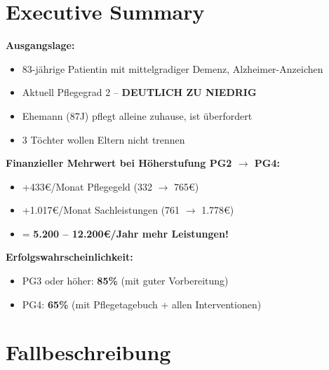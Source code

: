 \documentclass[11pt,a4paper]{article}
\begin{document}
\tableofcontents
\newpage

\section{Executive Summary}

\begin{successbox}

\textbf{Ausgangslage:}
\begin{itemize}[noitemsep]
    \item 83-jährige Patientin mit mittelgradiger Demenz, Alzheimer-Anzeichen
    \item Aktuell Pflegegrad 2 -- \textbf{DEUTLICH ZU NIEDRIG}
    \item Ehemann (87J) pflegt alleine zuhause, ist überfordert
    \item 3 Töchter wollen Eltern nicht trennen
\end{itemize}

\vspace{0.5cm}
\textbf{Finanzieller Mehrwert bei Höherstufung PG2 $\rightarrow$ PG4:}
\begin{itemize}[noitemsep]
    \item +433\euro{}/Monat Pflegegeld (332 $\rightarrow$ 765\euro{})
    \item +1.017\euro{}/Monat Sachleistungen (761 $\rightarrow$ 1.778\euro{})
    \item = \textbf{5.200 -- 12.200\euro{}/Jahr mehr Leistungen!}
\end{itemize}

\vspace{0.5cm}
\textbf{Erfolgswahrscheinlichkeit:}
\begin{itemize}[noitemsep]
    \item PG3 oder höher: \textbf{85\%} (mit guter Vorbereitung)
    \item PG4: \textbf{65\%} (mit Pflegetagebuch + allen Interventionen)
\end{itemize}

\end{successbox}

\section{Fallbeschreibung}
\end{document}
